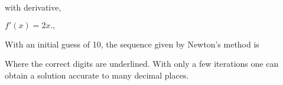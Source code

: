 \documentclass[24]{article}
\begin{document}
with derivative,

 $   f'(x) = 2x. , $

With an initial guess of 10, the sequence given by Newton's method is


Where the correct digits are underlined. With only a few iterations one can obtain a solution accurate to many decimal places.



\end{document}
